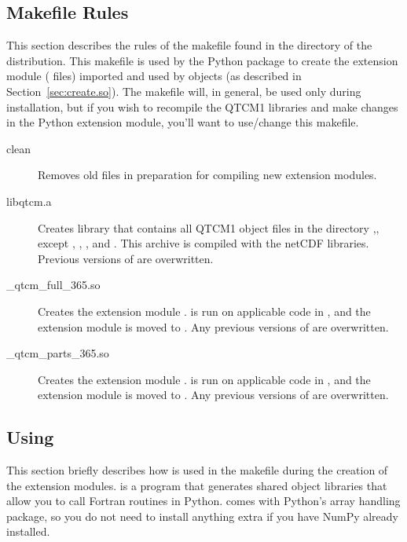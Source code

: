 	\subsection{Makefile Rules}    \label{sec:makefile.rules}

This section describes the rules of the
makefile found in the  directory
of the  distribution.  
This makefile is used by the Python package to create the extension
module ( files) imported and used by  objects
(as described in Section~\ref{sec:create.so}).
The makefile will, in general, be used only during 
installation, but if you wish to recompile the QTCM1 libraries
and make changes in the Python extension module,
you'll want to use/change this makefile.

\begin{description}
\item[clean] Removes old files in preparation for compiling new
	extension modules.

\item[libqtcm.a] Creates library  that contains all
	QTCM1 object files in the directory ,, except
	, , , and
	.  This archive is compiled with the netCDF
	libraries.  Previous versions of  are overwritten.

\item[\_qtcm\_full\_365.so] Creates the extension module
	.   is run on applicable code
	in , and the extension module is moved to .
	Any previous versions of 
	are overwritten.

\item[\_qtcm\_parts\_365.so] Creates the extension module
	.   is run on applicable code
	in , and the extension module is moved to .
	Any previous versions of 
	are overwritten.

\end{description}



	\subsection{Using }      \label{sec:using.f2py}

This section briefly describes how  is used in the
makefile during the creation of the extension modules.
 is a
program that generates shared object libraries that allow you to call
Fortran routines in Python.   comes with Python's
array handling package, so you do not need to install anything
extra if you have NumPy already installed.

